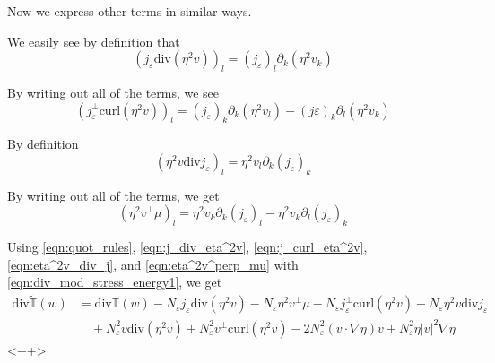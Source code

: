 \documentclass[a4paper]{article}
\newcommand{\curl}{\mathrm{curl}}
\renewcommand{\div}{\mathrm{div}}
\begin{document}
Now we express other terms in similar ways.

%

We easily see by definition that
\begin{equation}
  (j_\varepsilon \div (\eta^2 v) )_l = (j_\varepsilon)_l \partial_k (\eta^2 v_k)
  \label{eqn:j_div_eta^2v}
\end{equation}

By writing out all of the terms, we see
\begin{equation}
  (j_\varepsilon^\perp \curl ( \eta^2 v ) )_l = (j_\varepsilon)_k \partial_k ( \eta^2 v_l ) - (j\varepsilon)_k \partial_l ( \eta^2 v_k )
  \label{eqn:j_curl_eta^2v}
\end{equation}

By definition
\begin{equation}
  ( \eta^2 v \div j_\varepsilon )_l = \eta^2 v_l \partial_k (j_\varepsilon)_k
  \label{eqn:eta^2v_div_j}
\end{equation}

By writing out all of the terms, we get
\begin{equation}
  ( \eta^2 v^\perp \mu )_l = \eta^2 v_k \partial_k (j_\varepsilon)_l - \eta^2 v_k \partial_l (j_\varepsilon)_k
  \label{eqn:eta^2v^perp_mu}
\end{equation}

Using \eqref{eqn:quot_rules}, \eqref{eqn:j_div_eta^2v}, \eqref{eqn:j_curl_eta^2v}, \eqref{eqn:eta^2v_div_j}, and \eqref{eqn:eta^2v^perp_mu} with
\eqref{eqn:div_mod_stress_energy1}, we get
\begin{align}
  \div \tilde{\mathbb{T}}(w) &= \div \mathbb{T}(w) - N_\varepsilon j_\varepsilon \div(\eta^2 v) - N_\varepsilon \eta^2 v^\perp \mu - N_\varepsilon
  j_\varepsilon^\perp \curl ( \eta^2 v ) \nonumber - N_\varepsilon \eta^2 v \div j_\varepsilon \\
  &\quad + N_\varepsilon^2 v \div (\eta^2 v) + N_\varepsilon^2 v^\perp \curl ( \eta^2 v ) - 2 N_\varepsilon^2 (v \cdot \nabla \eta) v +
  N_\varepsilon^2 \eta |v|^2 \nabla \eta
  \label{eqn:div_mod_stress_energy}
\end{align}<++>
\end{document}
